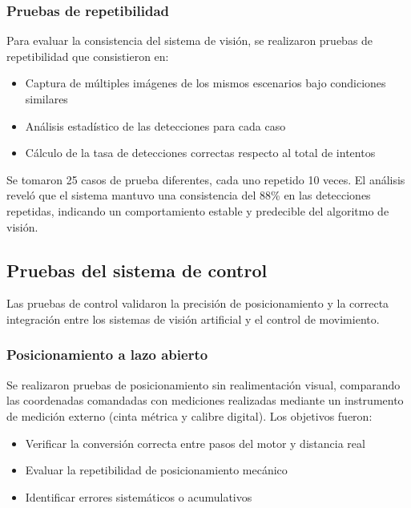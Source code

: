 \subsubsection{Pruebas de repetibilidad}

Para evaluar la consistencia del sistema de visión, se realizaron pruebas de repetibilidad que consistieron en:

\begin{itemize}[label=$\bullet$]
    \item Captura de múltiples imágenes de los mismos escenarios bajo condiciones similares
    \item Análisis estadístico de las detecciones para cada caso
    \item Cálculo de la tasa de detecciones correctas respecto al total de intentos
\end{itemize}

Se tomaron 25 casos de prueba diferentes, cada uno repetido 10 veces. El análisis reveló que el sistema mantuvo una consistencia del 88\% en las detecciones repetidas, indicando un comportamiento estable y predecible del algoritmo de visión.

\subsection{Pruebas del sistema de control}

Las pruebas de control validaron la precisión de posicionamiento y la correcta integración entre los sistemas de visión artificial y el control de movimiento.

\subsubsection{Posicionamiento a lazo abierto}

Se realizaron pruebas de posicionamiento sin realimentación visual, comparando las coordenadas comandadas con mediciones realizadas mediante un instrumento de medición externo (cinta métrica y calibre digital). Los objetivos fueron:

\begin{itemize}[label=$\bullet$]
    \item Verificar la conversión correcta entre pasos del motor y distancia real
    \item Evaluar la repetibilidad de posicionamiento mecánico
    \item Identificar errores sistemáticos o acumulativos
\end{itemize}

